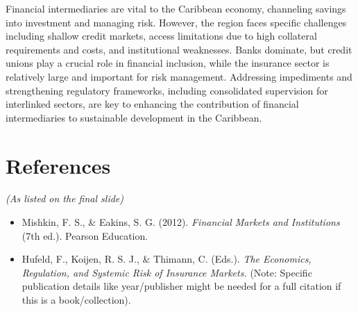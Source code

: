 Financial intermediaries are vital to the Caribbean economy, channeling savings into investment and managing risk. However, the region faces specific challenges including shallow credit markets, access limitations due to high collateral requirements and costs, and institutional weaknesses. Banks dominate, but credit unions play a crucial role in financial inclusion, while the insurance sector is relatively large and important for risk management. Addressing impediments and strengthening regulatory frameworks, including consolidated supervision for interlinked sectors, are key to enhancing the contribution of financial intermediaries to sustainable development in the Caribbean.

\section{References}
\textit{(As listed on the final slide)}
\begin{itemize}
    \item Mishkin, F. S., \& Eakins, S. G. (2012). \textit{Financial Markets and Institutions} (7th ed.). Pearson Education.
    \item Hufeld, F., Koijen, R. S. J., \& Thimann, C. (Eds.). \textit{The Economics, Regulation, and Systemic Risk of Insurance Markets.} (Note: Specific publication details like year/publisher might be needed for a full citation if this is a book/collection).
\end{itemize}
